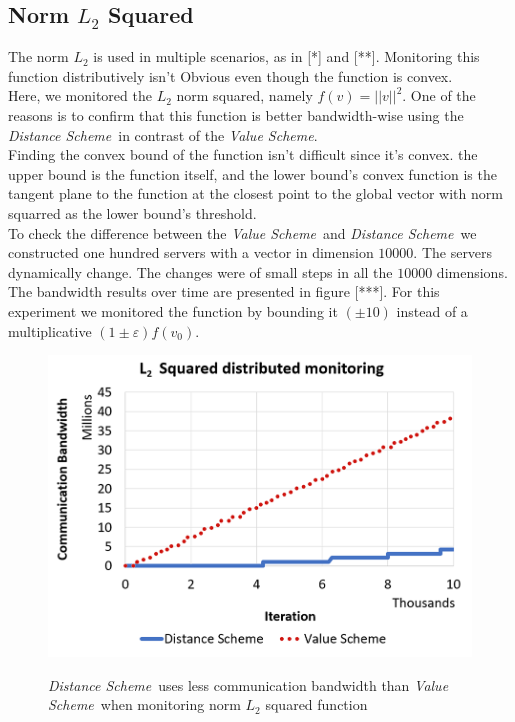 \documentclass[10pt, conference]{IEEEtran}
\newcommand{\valueScheme}{\textit{Value Scheme}}
\newcommand{\distanceScheme}{\textit{Distance Scheme}}
\begin{document}
\subsection{Norm $L_2$ Squared}
The norm $L_2$ is used in multiple scenarios, as in [*] and [**]. Monitoring this function distributively isn't Obvious even though the function is convex. \\
Here, we monitored the $L_2$ norm squared, namely $f(v) = ||v||^2$. One of the reasons is to confirm that this function is better bandwidth-wise using the \distanceScheme \ in contrast of the \valueScheme . \\
Finding the convex bound of the function isn't difficult since it's convex. the upper bound is the function itself, and the lower bound's convex function is the tangent plane to the function at the closest point to the global vector with norm squarred as the lower bound's threshold. \\
To check the difference between the \valueScheme \ and \distanceScheme \ we constructed one hundred servers with a vector in dimension $\num[group-separator={,}]{10000}$. The servers dynamically change. The changes were of small steps in all the $\num[group-separator={,}]{10000}$ dimensions. \\
The bandwidth results over time are presented in figure [***]. For this experiment we monitored the function by bounding it ${(\pm 10)}$ instead of a multiplicative ${(1 \pm \varepsilon)f(v_0)}$.
\begin{figure}[b]
\includegraphics[width=\linewidth]{Pics/Sphere.PNG}
\label{SphereMonitoring}
\caption{\distanceScheme \ uses less communication bandwidth than \valueScheme \ when monitoring norm $L_2$ squared function}
\end{figure} 
\end{document}

